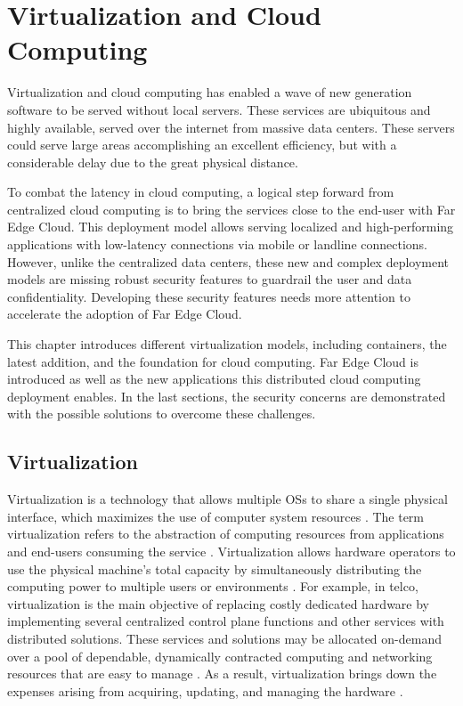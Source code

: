 \chapter{Virtualization and Cloud Computing}
\label{chapter:cloudcomputing}

Virtualization and cloud computing has enabled a wave of new generation software to be served without local servers. These services are ubiquitous and highly available, served over the internet from massive data centers. These servers could serve large areas accomplishing an excellent efficiency, but with a considerable delay due to the great physical distance.

To combat the latency in cloud computing, a logical step forward from centralized cloud computing is to bring the services close to the end-user with Far Edge Cloud. This deployment model allows serving localized and high-performing applications with low-latency connections via mobile or landline connections. However, unlike the centralized data centers, these new and complex deployment models are missing robust security features to guardrail the user and data confidentiality. Developing these security features needs more attention to accelerate the adoption of Far Edge Cloud.

This chapter introduces different virtualization models, including containers, the latest addition, and the foundation for cloud computing. Far Edge Cloud is introduced as well as the new applications this distributed cloud computing deployment enables. In the last sections, the security concerns are demonstrated with the possible solutions to overcome these challenges.

\section{Virtualization}

Virtualization is a technology that allows multiple OSs to share a single physical interface, which maximizes the use of computer system resources \cite{Dong2012}. The term virtualization refers to the abstraction of computing resources from applications and end-users consuming the service \cite{Xing2012}. Virtualization allows hardware operators to use the physical machine's total capacity by simultaneously distributing the computing power to multiple users or environments \cite{RedHat}. For example, in telco, virtualization is the main objective of replacing costly dedicated hardware by implementing several centralized control plane functions and other services with distributed solutions. These services and solutions may be allocated on-demand over a pool of dependable, dynamically contracted computing and networking resources that are easy to manage \cite{Bosch2011}. As a result, virtualization brings down the expenses arising from acquiring, updating, and managing the hardware \cite{Lingayat2018}\cite{Toimela2017}.

